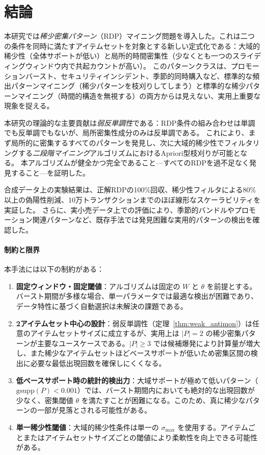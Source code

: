 \section{結論}\label{sec:conclusion}

本研究では\emph{稀少密集パターン}（RDP）マイニング問題を導入した。これは二つの条件を同時に満たすアイテムセットを対象とする新しい定式化である：大域的稀少性（全体サポートが低い）と局所的時間密集性（少なくとも一つのスライディングウィンドウ内で共起カウントが高い）。
このパターンクラスは、プロモーションバースト、セキュリティインシデント、季節的同時購入など、標準的な頻出パターンマイニング（稀少パターンを枝刈りしてしまう）と標準的な稀少パターンマイニング（時間的構造を無視する）の両方からは見えない、実用上重要な現象を捉える。

本研究の理論的な主要貢献は\emph{弱反単調性}である：RDP条件の組み合わせは単調でも反単調でもないが、局所密集性成分のみは反単調である。
これにより、まず局所的に密集するすべてのパターンを発見し、次に大域的稀少性でフィルタリングする\emph{二段階マイニング}アルゴリズムにおけるApriori型枝刈りが可能となる。
本アルゴリズムが健全かつ完全であること---すべてのRDPを過不足なく発見すること---を証明した。

合成データ上の実験結果は、正解RDPの100\%回収、稀少性フィルタによる80\%以上の偽陽性削減、10万トランザクションまでのほぼ線形なスケーラビリティを実証した。
さらに、実小売データ上での評価により、季節的バンドルやプロモーション関連パターンなど、既存手法では発見困難な実用的パターンの検出を確認した。

\paragraph{制約と限界}
本手法には以下の制約がある：
\begin{enumerate}
\item \textbf{固定ウィンドウ・固定閾値}：アルゴリズムは固定の $W$ と $\theta$ を前提とする。バースト期間が多様な場合、単一パラメータでは最適な検出が困難であり、データ特性に基づく自動選択は未解決の課題である。
\item \textbf{2アイテムセット中心の設計}：弱反単調性（定理~\ref{thm:weak_antimon}）は任意のアイテムセットサイズに成立するが、実用上は $|P| = 2$ の稀少密集パターンが主要なユースケースである。$|P| \geq 3$ では候補爆発により計算量が増大し、また稀少なアイテムセットほどベースサポートが低いため密集区間の検出に必要な最低出現回数を確保しにくくなる。
\item \textbf{低ベースサポート時の統計的検出力}：大域サポートが極めて低いパターン（$\text{gsupp}(P) < 0.001$）では、バースト期間内においても絶対的な出現回数が少なく、密集閾値 $\theta$ を満たすことが困難になる。このため、真に稀少なパターンの一部が見落とされる可能性がある。
\item \textbf{単一稀少性閾値}：大域的稀少性条件は単一の $\sigma_{\max}$ を使用する。アイテムごとまたはアイテムセットサイズごとの閾値により柔軟性を向上できる可能性がある。
\end{enumerate}

